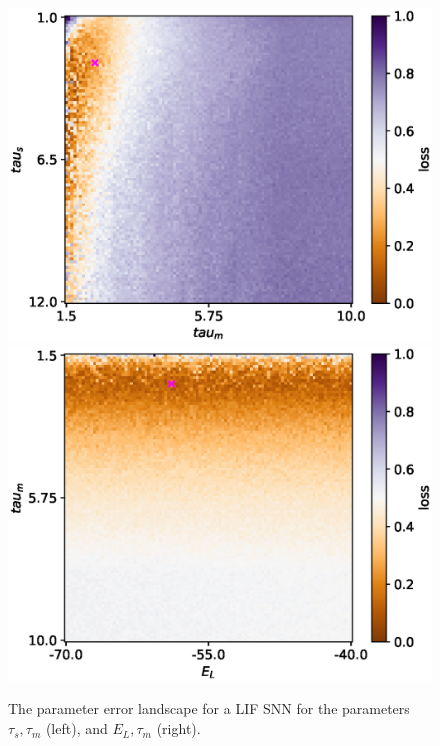 \documentclass[mphil,deptreport,ianc]{infthesis} %
\begin{document}
\begin{figure}
    \centering
    \vskip -0.1in
    \includegraphics[width=0.49\columnwidth]{figures/param_landscape_heatmaps/LIF/test_export_2d_heatmap_N_4_loss_tau_m_tau_s.eps}
    \includegraphics[width=0.49\columnwidth]{figures/param_landscape_heatmaps/LIF/test_export_2d_heatmap_N_4_loss_E_L_tau_m.eps}
    \vskip -0.1in
    \caption{The parameter error landscape for a LIF SNN for the parameters $\tau_s, \tau_m$ (left), and $E_L, \tau_m$ (right).}
    \label{fig:p_landscape_hmap_LIF}
\end{figure}




\end{document}
